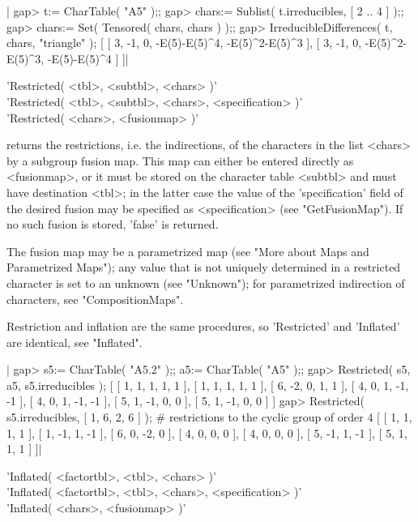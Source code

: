 |    gap> t:= CharTable( "A5" );;
    gap> chars:= Sublist( t.irreducibles, [ 2 .. 4 ] );;
    gap> chars:= Set( Tensored( chars, chars ) );;
    gap> IrreducibleDifferences( t, chars, "triangle" );
    [ [ 3, -1, 0, -E(5)-E(5)^4, -E(5)^2-E(5)^3 ],
      [ 3, -1, 0, -E(5)^2-E(5)^3, -E(5)-E(5)^4 ] ]|

%

'Restricted( <tbl>, <subtbl>, <chars> )'\\
'Restricted( <tbl>, <subtbl>, <chars>, <specification> )'\\
'Restricted( <chars>, <fusionmap> )'

returns the restrictions, i.e. the indirections, of the characters in the
list <chars> by a  subgroup fusion map.   This map can either be  entered
directly  as  <fusionmap>, or  it must  be stored  on the character table
<subtbl> and must have destination <tbl>; in the latter case the value of
the  'specification' field  of the  desired   fusion may  be specified as
<specification>  (see  "GetFusionMap").   If no  such   fusion is stored,
'false' is returned.

The  fusion  map may be  a  parametrized  map (see  "More  about Maps and
Parametrized Maps"); any   value that is   not uniquely determined   in a
restricted character is  set    to  an  unknown (see    "Unknown");   for
parametrized indirection of characters, see "CompositionMaps".

Restriction and inflation are  the  same procedures, so 'Restricted'  and
'Inflated' are identical, see "Inflated".

|    gap> s5:= CharTable( "A5.2" );; a5:= CharTable( "A5" );;
    gap> Restricted( s5, a5, s5.irreducibles );
    [ [ 1, 1, 1, 1, 1 ], [ 1, 1, 1, 1, 1 ], [ 6, -2, 0, 1, 1 ],
      [ 4, 0, 1, -1, -1 ], [ 4, 0, 1, -1, -1 ], [ 5, 1, -1, 0, 0 ],
      [ 5, 1, -1, 0, 0 ] ]
    gap> Restricted( s5.irreducibles, [ 1, 6, 2, 6 ] );
                        # restrictions to the cyclic group of order 4
    [ [ 1, 1, 1, 1 ], [ 1, -1, 1, -1 ], [ 6, 0, -2, 0 ], [ 4, 0, 0, 0 ],
      [ 4, 0, 0, 0 ], [ 5, -1, 1, -1 ], [ 5, 1, 1, 1 ] ]|

%

'Inflated( <factortbl>, <tbl>, <chars> )'\\
'Inflated( <factortbl>, <tbl>, <chars>, <specification> )'\\
'Inflated( <chars>, <fusionmap> )'

